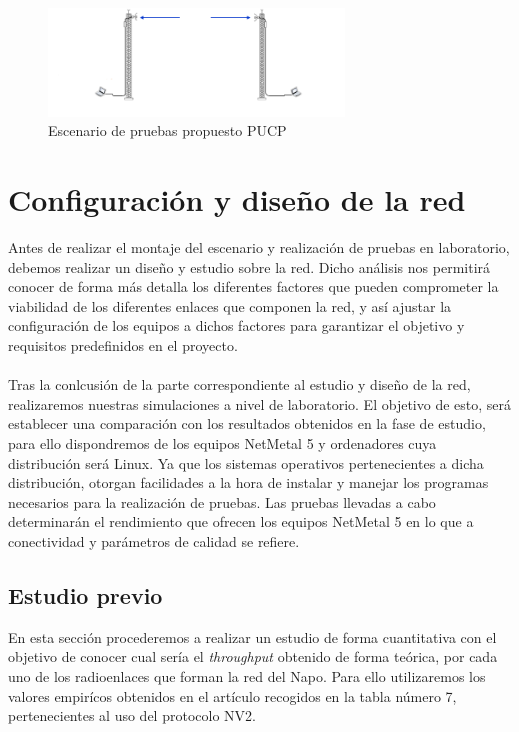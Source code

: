  
 \begin{figure}[H]
			\centering
			\includegraphics[width=0.7\textwidth]{img/escenario_pruebas.png}
			\caption{Escenario de pruebas propuesto PUCP}
			\label{pruebasPUCP}
\end{figure}
 
\section{Configuración y diseño de la red}
Antes de realizar el montaje del escenario y realización de pruebas en laboratorio, debemos realizar un diseño y estudio sobre la red. Dicho análisis nos permitirá conocer de forma más detalla los diferentes factores que pueden comprometer la viabilidad de los diferentes enlaces que componen la red, y así ajustar la configuración de los equipos a dichos factores para garantizar el objetivo y requisitos predefinidos en el proyecto.\\\\

Tras la conlcusión de la parte correspondiente al estudio y diseño de la red, realizaremos nuestras simulaciones a nivel de laboratorio. El objetivo de esto, será establecer una comparación con los resultados obtenidos en la fase de estudio, para ello dispondremos de los equipos NetMetal 5 y ordenadores cuya distribución será Linux. Ya que los sistemas operativos pertenecientes a dicha distribución, otorgan facilidades a la hora de instalar y manejar los programas necesarios para la realización de pruebas. Las pruebas llevadas a cabo determinarán el rendimiento que ofrecen los equipos NetMetal 5 en lo que a conectividad y parámetros de calidad se refiere.

\subsection{Estudio previo} 
	En esta sección procederemos a realizar un estudio de forma cuantitativa con el objetivo de conocer cual sería el \textit{throughput} obtenido de forma teórica, por cada uno de los radioenlaces que forman la red del Napo. Para ello utilizaremos los valores empirícos obtenidos en el artículo \cite{simo2014assessing} recogidos en la tabla número 7,  pertenecientes al uso del protocolo NV2.\\\\
	
